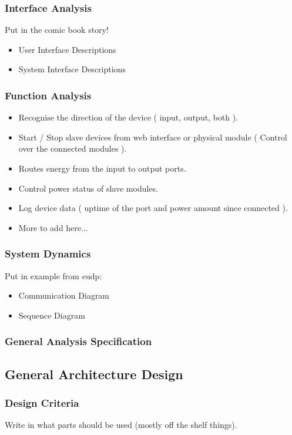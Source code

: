 	\subsubsection{Interface Analysis}
			Put in the comic book story!
		\begin{itemize}
			\item User Interface Descriptions
				
			\item System Interface Descriptions
		\end{itemize}
	\subsubsection{Function Analysis}
		\begin{itemize}
			\item Recognise the direction of the device ( input, output, both ).
			\item Start / Stop slave devices from web interface or physical module ( Control over the connected modules ).
			\item Routes energy from the input to output ports.
			\item Control power status of slave modules.
			\item Log device data ( uptime of the port and power amount since connected ).
			\item More to add here...
		\end{itemize}
	\subsubsection{System Dynamics}
			Put in example from eudp: %
		\begin{itemize}
			\item Communication Diagram
			\item Sequence Diagram
		\end{itemize}
	\subsubsection{General Analysis Specification}
\subsection{General Architecture Design}
	\subsubsection{Design Criteria}
		Write in what parts should be used (mostly off the shelf things).
